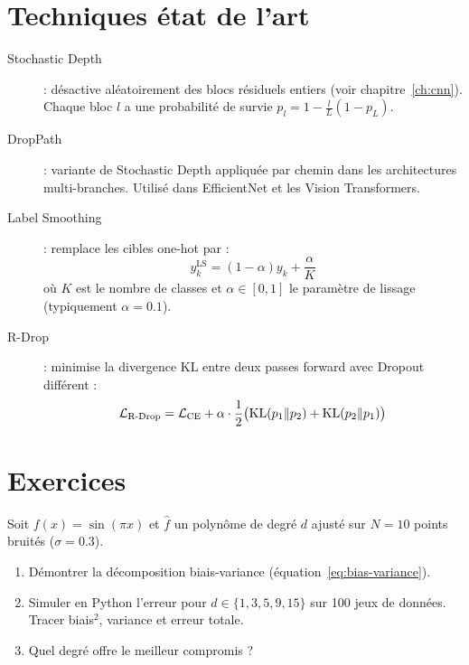 \section{Techniques \'etat de l'art}
\label{sec:reg-sota}

\begin{sota}[title=\textbf{Techniques de r\'egularisation modernes}]
\begin{description}
  \item[Stochastic Depth] \cite{huang2016deep} : d\'esactive al\'eatoirement
    des blocs r\'esiduels entiers (voir chapitre~\ref{ch:cnn}). Chaque bloc
    $l$ a une probabilit\'e de survie $p_l = 1 - \frac{l}{L}(1 - p_L)$.

  \item[DropPath] : variante de Stochastic Depth appliqu\'ee par chemin
    dans les architectures multi-branches. Utilis\'e dans EfficientNet et
    les Vision Transformers.

  \item[Label Smoothing] \cite{szegedy2016rethinking} : remplace les cibles
    one-hot par :
    \begin{equation}
      y_k^{\text{LS}} = (1 - \alpha) y_k + \frac{\alpha}{K}
    \end{equation}
    o\`u $K$ est le nombre de classes et $\alpha \in [0, 1]$ le param\`etre
    de lissage (typiquement $\alpha = 0.1$).

  \item[R-Drop] \cite{wu2021r} : minimise la divergence KL entre deux passes
    forward avec Dropout diff\'erent :
    \begin{equation}
      \mathcal{L}_{\text{R-Drop}} = \mathcal{L}_{\text{CE}}
        + \alpha \cdot \frac{1}{2}\bigl(\mathrm{KL}(p_1 \| p_2) + \mathrm{KL}(p_2 \| p_1)\bigr)
    \end{equation}
\end{description}
\end{sota}

\section{Exercices}
\label{sec:reg-exercices}

\begin{exercice}
Soit $f(x) = \sin(\pi x)$ et $\hat{f}$ un polyn\^ome de degr\'e $d$ ajust\'e
sur $N = 10$ points bruit\'es ($\sigma = 0.3$).
\begin{enumerate}
  \item D\'emontrer la d\'ecomposition biais-variance (\'equation~\ref{eq:bias-variance}).
  \item Simuler en Python l'erreur pour $d \in \{1, 3, 5, 9, 15\}$ sur 100
    jeux de donn\'ees. Tracer biais$^2$, variance et erreur totale.
  \item Quel degr\'e offre le meilleur compromis ?
\end{enumerate}
\end{exercice}

